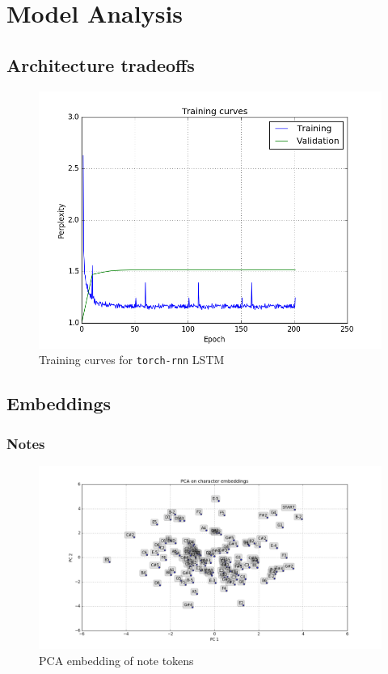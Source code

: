 \chapter{Model Analysis}

\section{Architecture tradeoffs}

\begin{figure}[htpb]
    \centering
    \includegraphics[width=0.8\linewidth]{Figures/training-curves.png}
    \caption{Training curves for \texttt{torch-rnn} LSTM}
    \label{fig:torch-rnn-training-curve}
\end{figure}

\section{Embeddings}

\subsection{Notes}

\begin{figure}[htpb]
    \centering
    \includegraphics[width=0.8\linewidth]{Figures/PCA-notes.png}
    \caption{PCA embedding of note tokens}
    \label{fig:pca-notes}
\end{figure}


